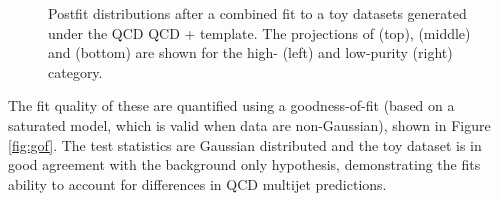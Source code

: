 \begin{figure}[h!]
\caption{Postfit distributions after a combined fit to a toy datasets generated under the QCD QCD \MADGRAPH{}+ template. The projections of \MJO (top), \MJT (middle) and \MVV (bottom) are shown for the high- (left) and low-purity (right) category.}
\label{fig:postfitMadgraph}
\end{figure}
The fit quality of these are quantified using a goodness-of-fit (based on a saturated model, which is valid when data are non-Gaussian), shown in Figure \ref{fig:gof}. The test statistics are Gaussian distributed and the toy dataset is in good agreement with the background only hypothesis, demonstrating the fits ability to account for differences in QCD multijet predictions.
\begin{figure}[h!]
\centering
{}
\\

\end{figure}
